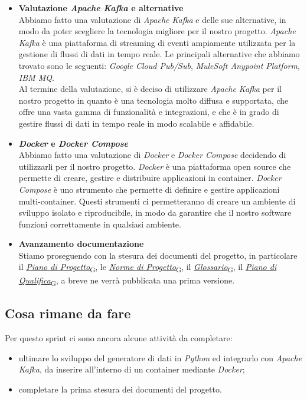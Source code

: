 \documentclass[italian,12pt]{article}
\begin{document}
\begin{itemize}
	\item \textbf{Valutazione \textit{Apache Kafka} e alternative} \\
	Abbiamo fatto una valutazione di \textit{Apache Kafka} e delle sue alternative, in modo da poter scegliere la tecnologia migliore per il nostro progetto. \textit{Apache Kafka} è una piattaforma di streaming di eventi ampiamente utilizzata per la gestione di flussi di dati in tempo reale. Le principali alternative che abbiamo trovato sono le seguenti: \textit{Google Cloud Pub/Sub}, \textit{MuleSoft Anypoint Platform}, \textit{IBM MQ}. \\
	Al termine della valutazione, si è deciso di utilizzare \textit{Apache Kafka} per il nostro progetto in quanto è una tecnologia molto diffusa e supportata, che offre una vasta gamma di funzionalità e integrazioni, e che è in grado di gestire flussi di dati in tempo reale in modo scalabile e affidabile.
	\item \textbf{\textit{Docker} e \textit{Docker Compose}} \\
	Abbiamo fatto una valutazione di \textit{Docker} e \textit{Docker Compose} decidendo di utilizzarli per il nostro progetto. \textit{Docker} è una piattaforma open source che permette di creare, gestire e distribuire applicazioni in container. \textit{Docker Compose} è uno strumento che permette di definire e gestire applicazioni multi-container. Questi strumenti ci permetteranno di creare un ambiente di sviluppo isolato e riproducibile, in modo da garantire che il nostro software funzioni correttamente in qualsiasi ambiente.
	\item \textbf{Avanzamento documentazione} \\
	Stiamo proseguendo con la stesura dei documenti del progetto, in particolare il \href{https://7last.github.io/docs/rtb/documentazione-interna/glossario#piano-di-progetto}{\textit{Piano di Progetto}\textsubscript{G}}, le \href{https://7last.github.io/docs/rtb/documentazione-interna/glossario#norme-di-progetto}{\textit{Norme di Progetto}\textsubscript{G}}, il \href{https://7last.github.io/docs/rtb/documentazione-interna/glossario#glossario}{\textit{Glossario}\textsubscript{G}}, il \href{https://7last.github.io/docs/rtb/documentazione-interna/glossario#piano-di-qualifica}{\textit{Piano di Qualifica}\textsubscript{G}}, a breve ne verrà pubblicata una prima versione.
\end{itemize}

\subsection{Cosa rimane da fare}
Per questo sprint ci sono ancora alcune attività da completare:
\begin{itemize}
	\item ultimare lo sviluppo del generatore di dati in \textit{Python} ed integrarlo con \textit{Apache Kafka}, da inserire all'interno di un container mediante \textit{Docker};
	\item completare la prima stesura dei documenti del progetto.
\end{itemize}
\end{document}
